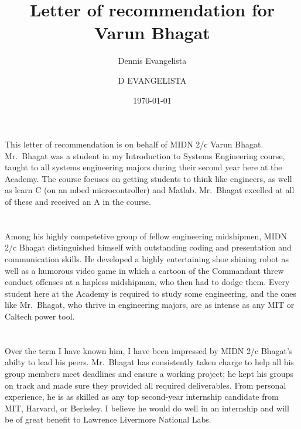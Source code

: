 \documentclass[12pt,courier]{navyletter}
\author{Dennis Evangelista}
\title{Letter of recommendation for Varun Bhagat}
\date{\today}
\begin{document}
\makedateblock{}

\begin{navyletterheader}
\navyskip%
\navysubjline%
\end{navyletterheader}

\section{}
This letter of recommendation is on behalf of MIDN 2/c Varun Bhagat.  Mr.~Bhagat was a student in my Introduction to Systems Engineering course, taught to all systems engineering majors during their second year here at the Academy. The course focuses on getting students to think like engineers, as well as learn C (on an mbed microcontroller) and Matlab. Mr.~Bhagat excelled at all of these and received an A in the course. 

\section{} 
Among his highly competetive group of fellow engineering midshipmen, MIDN 2/c Bhagat distinguished himself with outstanding coding and presentation and communication skills.  He developed a highly entertaining shoe shining robot as well as a humorous video game in which a cartoon of the Commandant threw conduct offenses at a hapless midshipman, who then had to dodge them.  Every student here at the Academy is required to study some engineering, and the ones like Mr.~Bhagat, who thrive in engineering majors, are as intense as any MIT or Caltech power tool.  

\section{}
Over the term I have known him, I have been impressed by MIDN 2/c Bhagat's abilty to lead his peers.  Mr.~Bhagat has consistently taken charge to help all his group members meet deadlines and ensure a working project; he kept his groups on track and made sure they provided all required deliverables.  From personal experience, he is as skilled as any top second-year internship candidate from MIT, Harvard, or Berkeley.  I believe he would do well in an internship and will be of great benefit to Lawrence Livermore National Labs. 


\noclosing{}\\
\noindent\hspace*{4in}
\signature{D EVANGELISTA}

\end{document}
